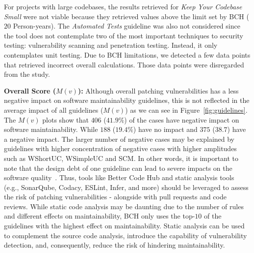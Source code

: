 \documentclass[10pt,conference]{IEEEtran}
\begin{document}
For projects with large codebases, the results retrieved for \emph{Keep Your 
Codebase Small} were not viable because they retrieved values above the limit 
set by BCH ($20$ Person-years). The \emph{Automated Tests} guideline was also 
not considered since the tool does not contemplate two
of the most important techniques to security testing: vulnerability scanning
and penetration testing. Instead, it only contemplates unit 
testing. Due to BCH limitations, we detected a few data points
that retrieved incorrect overall calculations. 
Those data points were disregarded from the study.

\textbf{Overall Score ($M(v)$):} 
Although overall patching vulnerabilities has a less negative impact
on software maintainability guidelines, this is not reflected in the average 
impact of all guidelines ($M(v)$) as we can see in Figure~\ref{fig:guidelines}.
The $M(v)$ plots show that $406$ ($41.9\%$) of the cases have negative impact
on software maintainability. While $188$ ($19.4\%$) have no impact and $375$ ($38.7$)
have a negative impact. The larger number of negative cases may be 
explained by guidelines with higher concentration of negative cases with higher amplitudes
such as WShortUC, WSimpleUC and SCM. In other words, it is 
important to note that the design debt of one guideline can lead
to severe impacts on the software quality~\cite{10.1145/1985362.1985366}.  
Thus, tools like Better Code Hub and static analysis tools (e.g., SonarQube, Codacy,
ESLint, Infer, and more) should be leveraged to 
assess the risk of patching vulnerabilities - alongside with pull
requests and code reviews. While static code analysis
may be daunting due to the number of rules and different effects
on maintainability, BCH only uses the top-$10$ of the guidelines
with the highest effect on maintainability. Static analysis 
can be used to complement the source code analysis, introduce
the capability of vulnerability detection, and, consequently,
reduce the risk of hindering maintainability. 
\end{document}

